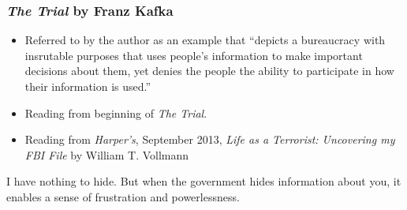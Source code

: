 \documentclass{beamer}
\begin{document}
\begin{frame}
\frametitle{\emph{The Trial} by Franz Kafka}

\begin{itemize}
\item Referred to by the author as an example that ``depicts a
  bureaucracy with insrutable purposes that uses people's information
  to make important decisions about them, yet denies the people the
  ability to participate in how their information is used.''

\item Reading from beginning of \emph{The Trial}.
\item Reading from \emph{Harper's}, September 2013, \emph{Life as a
  Terrorist: Uncovering my FBI File} by William T. Vollmann
\end{itemize}

\begin{block}{I have nothing to hide.}
    But when the government hides information about you, it enables a
    sense of frustration and powerlessness.
  \end{block}


\end{frame}
\end{document}
